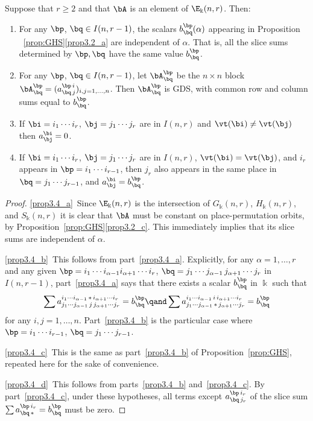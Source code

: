 \begin{prop}\label{prop:inv-properties}
 Suppose that $r \ge 2$ and that $\bA$ is an element of
 $\E_\Bbbk(n,r)$. Then:
 \begin{enumerate}[label=(\alph*)]
 \item\label{prop3.4_a} For any $\bp$, $\bq \in I(n,r-1)$, the scalars
 $b^\bp_\bq(\alpha)$ appearing in Proposition
~\ref{prop:GHS}\ref{prop3.2_a} are
 independent of $\alpha$. That is, all the slice sums determined by
 $\bp, \bq$ have the same value $b^\bp_\bq$.
 \item\label{prop3.4_b} For any $\bp$, $\bq \in I(n,r-1)$, let $\bA^\bp_\bq$ be the $n
 \times n$ block $\bA^\bp_\bq = (a^{\bp\, i}_{\bq\, j})_{i,j = 1,
 \dots, n}$. Then $\bA^\bp_\bq$ is GDS, with common row and
 column sums equal to $b^\bp_\bq$.
 \item\label{prop3.4_c} If $\bi = i_1 \cdots i_r$, $\bj = j_1 \cdots j_r$ are in
 $I(n,r)$ and $\vt(\bi) \ne \vt(\bj)$ then $a^\bi_\bj = 0$.
 \item\label{prop3.4_d} If $\bi = i_1 \cdots i_r$, $\bj = j_1 \cdots j_r$ are in
 $I(n,r)$, $\vt(\bi) = \vt(\bj)$, and $i_r$ appears in $\bp = i_1
 \cdots i_{r-1}$, then $j_r$ also appears in the same place in $\bq
 = j_1 \cdots j_{r-1}$, and $a^\bi_\bj = b^\bp_\bq$.
 \end{enumerate}
\end{prop}

\begin{proof}
\ref{prop3.4_a}~Since $\E_\Bbbk(n,r)$ is the intersection of $G_\Bbbk(n,r)$,
$H_\Bbbk(n,r)$, and $S_\Bbbk(n,r)$ it is clear that $\bA$ must be
constant on place-permutation orbits, by Proposition~\ref{prop:GHS}\ref{prop3.2_c}. This immediately implies that its slice sums are
independent of $\alpha$.

\ref{prop3.4_b}~This follows from part~\ref{prop3.4_a}. Explicitly, for any $\alpha = 1,
\dots, r$ and any given $\bp = i_1 \cdots i_{\alpha-1} i_{\alpha+1}
\cdots i_r$, $\bq = j_1 \cdots j_{\alpha-1} \, j_{\alpha+1} \cdots
j_r$ in $I(n,r-1)$, part~\ref{prop3.4_a} says that there exists a scalar
$b^\bp_\bq$ in $\Bbbk$ such that
\[
\sum a^{i_1\cdots i_{\alpha-1} \,*\, i_{\alpha+1}\cdots
 i_r}_{j_1\cdots j_{\alpha-1} \, j \, j_{\alpha+1}\cdots j_r} =
b^\bp_\bq \qand \sum a^{i_1\cdots i_{\alpha-1} \, i \,
 i_{\alpha+1}\cdots i_r}_{j_1\cdots j_{\alpha-1} \,*\,
 j_{\alpha+1}\cdots j_r} = b^\bp_\bq
\]
for any $i,j = 1, \dots, n$. Part~\ref{prop3.4_b} is the particular case where
$\bp = i_1 \cdots i_{r-1}$, $\bq = j_1 \cdots j_{r-1}$.

\ref{prop3.4_c}~This is the same as part~\ref{prop3.4_b} of Proposition~\ref{prop:GHS}, repeated
here for the sake of convenience.

\ref{prop3.4_d}~This follows from parts~\ref{prop3.4_b} and~\ref{prop3.4_c}. By part~\ref{prop3.4_c}, under these hypotheses, all terms except $a^{\bp\,i_r}_{\bq\,j_r}$ of the slice
sum $\sum a^{\bp\,i_r}_{\bq\,*} = b^{\bp}_{\bq}$ must be zero.
\end{proof}

